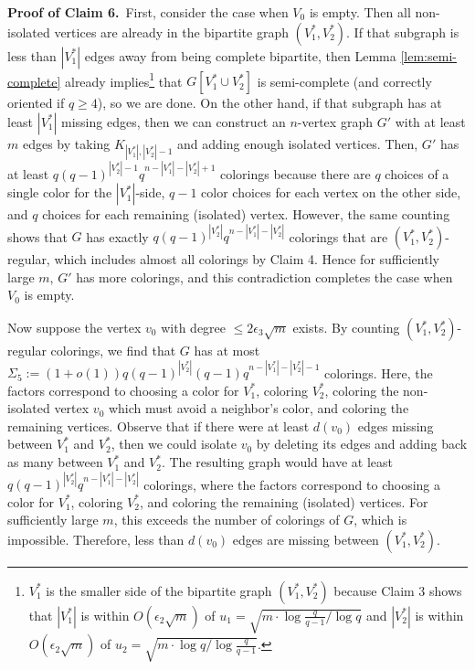 \documentclass[11pt]{article}
\begin{document}
\vspace{3mm}



\noindent \textbf{Proof of Claim 6.}\, First, consider the case when
$V_0$ is empty.  Then all non-isolated vertices are already in the
bipartite graph $(V_1^*, V_2^*)$.  If that subgraph is less than
$|V_1^*|$ edges away from being complete bipartite, then Lemma
\ref{lem:semi-complete} already implies\footnote{$V_1^*$ is the
  smaller side of the bipartite graph $(V_1^*, V_2^*)$ because Claim 3
  shows that $|V_1^*|$ is within $O(\epsilon_2 \sqrt{m})$ of $u_1 =
  \sqrt{m \cdot \log \frac{q}{q-1} / \log q}$ and $|V_2^*|$ is within
  $O(\epsilon_2 \sqrt{m})$ of $u_2 = \sqrt{m \cdot \log q / \log
    \frac{q}{q-1}}$.}  that $G[V_1^* \cup V_2^*]$ is semi-complete
(and correctly oriented if $q \geq 4$), so we are done.  On the other
hand, if that subgraph has at least $|V_1^*|$ missing edges, then we
can construct an $n$-vertex graph $G'$ with at least $m$ edges by
taking $K_{|V_1^*|, |V_2^*| - 1}$ and adding enough isolated vertices.
Then, $G'$ has at least $q(q-1)^{|V_2^*|-1}q^{n-|V_1^*|-|V_2^*|+1}$
colorings because there are $q$ choices of a single color for the
$|V_1^*|$-side, $q-1$ color choices for each vertex on the other side,
and $q$ choices for each remaining (isolated) vertex.  However, the
same counting shows that $G$ has exactly $q(q-1)^{|V_2^*|}
q^{n-|V_1^*|-|V_2^*|}$ colorings that are $(V_1^*, V_2^*)$-regular,
which includes almost all colorings by Claim 4.  Hence for
sufficiently large $m$, $G'$ has more colorings, and this
contradiction completes the case when $V_0$ is empty.

Now suppose the vertex $v_0$ with degree $\leq 2\epsilon_3 \sqrt{m}$
exists.  By counting $(V_1^*, V_2^*)$-regular colorings, we find that
$G$ has at most $\Sigma_5 := (1+o(1))
q(q-1)^{|V_2^*|}(q-1)q^{n-|V_1^*|-|V_2^*|-1}$ colorings.  Here, the
factors correspond to choosing a color for $V_1^*$, coloring $V_2^*$,
coloring the non-isolated vertex $v_0$ which must avoid a neighbor's
color, and coloring the remaining vertices.  Observe that if there
were at least $d(v_0)$ edges missing between $V_1^*$ and $V_2^*$, then
we could isolate $v_0$ by deleting its edges and adding back as many
between $V_1^*$ and $V_2^*$.  The resulting graph would have at least
$q(q-1)^{|V_2^*|} q^{n-|V_1^*|-|V_2^*|}$ colorings, where the factors
correspond to choosing a color for $V_1^*$, coloring $V_2^*$, and
coloring the remaining (isolated) vertices.  For sufficiently large
$m$, this exceeds the number of colorings of $G$, which is impossible.
Therefore, less than $d(v_0)$ edges are missing between $(V_1^*,
V_2^*)$.
\end{document}
